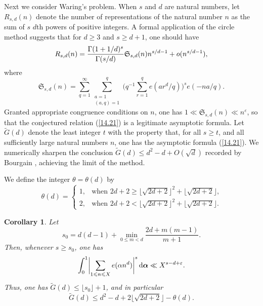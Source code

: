 \documentclass[12pt,reqno]{amsart}
\newtheorem{corollary}[theorem]{Corollary}
\theoremstyle{definition}
\theoremstyle{remark}
\numberwithin{equation}{section}
\def\Gtil{\widetilde G}\def\Itil{\widetilde I}\def\Ktil{\widetilde K}
\def\grS{{\mathfrak S}}\def\grP{{\mathfrak P}}
\def\alp{{\alpha}} \def\bfalp{{\boldsymbol \alpha}}
\def\tet{{\theta}} \def\bftet{{\boldsymbol \theta}}
\def\eps{\varepsilon}
\def\le{\leqslant} \def\ge{\geqslant} \def\pleq{\preccurlyeq} \def\ple{\prec}
\def\d{{\,{\rm d}}}
\begin{document}
Next we consider Waring's problem. When $s$ and $d$ are natural numbers, let 
$R_{s,d}(n)$ denote the number of representations of the natural number $n$ as the sum 
of $s$ $d$th powers of positive integers. A formal application of the circle method suggests 
that for $d\ge 3$ and $s\ge d+1$, one should have
\begin{equation}\label{14.21}
R_{s,d}(n)=\frac{\Gam(1+1/d)^s}{\Gam(s/d)}\grS_{s,d}(n)n^{s/d-1}+o(n^{s/d-1}),
\end{equation}
where
$$\grS_{s,d}(n)=\sum_{q=1}^\infty\sum^q_{\substack{a=1\\ (a,q)=1}}\biggl( 
q^{-1}\sum_{r=1}^qe(ar^d/q)\biggr)^se(-na/q).$$
Granted appropriate congruence conditions on $n$, one has $1\ll \grS_{s,d}(n)\ll n^\eps$, 
so that the conjectured relation (\ref{14.21}) is a legitimate asymptotic formula. Let 
$\Gtil(d)$ denote the least integer $t$ with the property that, for all $s\ge t$, and all 
sufficiently large natural numbers $n$, one has the asymptotic formula (\ref{14.21}). 
We numerically sharpen the conclusion $\Gtil(d)\le d^2-d+O(\sqrt{d})$ recorded by 
Bourgain \cite[Theorem 11]{Bou2017}, achieving the limit of the method.\par

We define the integer $\tet=\tet(d)$ by
\begin{equation}\label{14.22}
\tet(d)=\begin{cases} 1,&\text{when $2d+2\ge \lfloor \sqrt{2d+2}\rfloor^2+
\lfloor \sqrt{2d+2}\rfloor$,}\\
2,&\text{when $2d+2< \lfloor \sqrt{2d+2}\rfloor^2+
\lfloor \sqrt{2d+2}\rfloor$.}
\end{cases}
\end{equation}

\begin{corollary}\label{corollary14.7} Let
$$s_0=d(d-1)+\min_{0\le m<d}\frac{2d+m(m-1)}{m+1}.$$
Then, whenever $s\ge s_0$, one has
\begin{equation}\label{14.23}
\int_0^1\biggl| \sum_{1\le n\le X}e(\alp n^d)\biggr|^s\d\bfalp \ll X^{s-d+\eps}.
\end{equation}
Thus, one has $\Gtil(d)\le \lfloor s_0\rfloor +1$, and in particular
$$\Gtil(d)\le d^2-d+2\lfloor \sqrt{2d+2}\rfloor -\tet(d).$$
\end{corollary}
\end{document}
